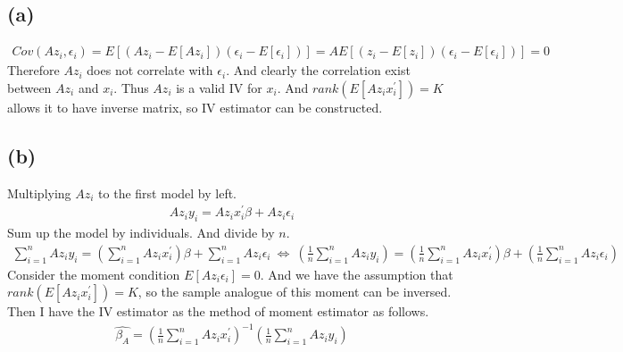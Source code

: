\documentclass{article}
\begin{document}
\subsection{(a)}
\begin{align*}
	Cov(Az_i, \epsilon_i) = E[(Az_i - E[Az_i])(\epsilon_i - E[\epsilon_i])] = A E[(z_i - E[z_i])(\epsilon_i - E[\epsilon_i])] = 0
\end{align*}
Therefore $Az_i$ does not correlate with $\epsilon_i$. And clearly the correlation exist between $Az_i$ and $x_i$. Thus $Az_i$ is a valid IV for $x_i$. And $rank(E[Az_i x_i^{'}]) = K$ allows it to have inverse matrix, so IV estimator can be constructed.

\subsection{(b)}
Multiplying $Az_i$ to the first model by left.
\begin{align*}
	Az_iy_i = Az_ix_i^{'}\beta + Az_i\epsilon_i
\end{align*}
Sum up the model by individuals. And divide by $n$.
\begin{align*}
	\sum_{i = 1}^n Az_iy_i = (\sum_{i = 1}^n Az_ix_i^{'})\beta + \sum_{i=1}^nAz_i\epsilon_i \ \Leftrightarrow\ \left(\frac{1}{n}\sum_{i = 1}^n Az_iy_i\right) = \left(\frac{1}{n}\sum_{i = 1}^n Az_ix_i^{'}\right)\beta + \left( \frac{1}{n}\sum_{i=1}^nAz_i\epsilon_i \right)
\end{align*}
Consider the moment condition $E[Az_i\epsilon_i] = 0$. And we have the assumption that $rank(E[Az_i x_i^{'}]) = K$, so the sample analogue of this moment can be inversed. Then I have the IV estimator as the method of moment estimator as follows.
\begin{align*}
	\hat{\beta_A} = \left(\frac{1}{n}\sum_{i = 1}^n Az_ix_i^{'}\right)^{-1} \left(\frac{1}{n}\sum_{i = 1}^n Az_iy_i\right)
\end{align*}
\end{document}
